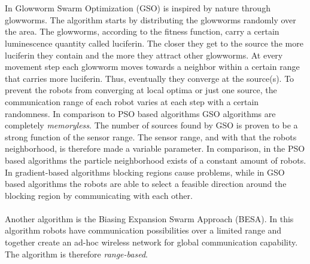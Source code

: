 		\\ \\
		In Glowworm Swarm Optimization (GSO) is inspired by nature through glowworms.
		The algorithm starts by distributing the glowworms randomly over the area.
		The glowworms, according to the fitness function, carry a certain luminescence quantity called luciferin. 
		The closer they get to the source the more luciferin they contain and the more they attract other glowworms. 
		At every movement step each glowworm moves towards a neighbor within a certain range that carries more luciferin.
		Thus, eventually they converge at the source(s). 
		To prevent the robots from converging at local optima or just one source, the communication range of each robot varies at each step with a certain randomness.
		In comparison to PSO based algorithms GSO algorithms are completely \emph{memoryless}.
		The number of sources found by GSO is proven to be a strong function of the sensor range.
		The sensor range, and with that the robots neighborhood, is therefore made a variable parameter.
		In comparison, in the PSO based algorithms the particle neighborhood exists of a constant amount of robots.
		In gradient-based algorithms blocking regions cause problems, while in GSO based algorithms the robots are able to select a feasible direction around the blocking region by communicating with each other. \cite{krishnanand2005detection}
		\\ \\
		Another algorithm is the Biasing Expansion Swarm Approach (BESA).
		In this algorithm robots have communication possibilities over a limited range and together create an ad-hoc wireless network for global communication capability.
		The algorithm is therefore \emph{range-based}.
